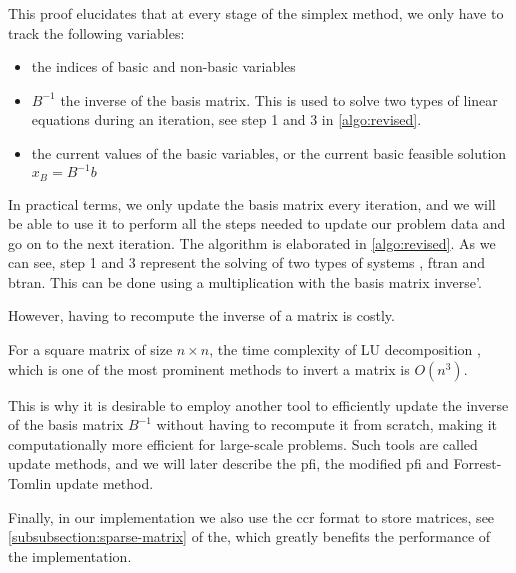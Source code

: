 This proof elucidates that at every stage of the simplex method, we only have to
 track the following variables:
\begin{itemize}
    \item the indices of basic and non-basic variables
    \item $B^{-1}$ the inverse of the basis matrix. This is used to solve two types of linear equations
    during an iteration, see step 1 and 3 in \ref{algo:revised}.
    \item the current values of the basic variables, or the current basic feasible solution $x_B = B^{-1}b$
\end{itemize}
In practical terms, we only update the basis matrix every iteration, and we will be able to use it to
perform all the steps needed to update our problem data and go on to the next
iteration.
The algorithm is elaborated in \ref{algo:revised}. As we can see, step 1 and 3 represent the solving of
two types of systems , \gls{ftran} and \gls{btran}. This can be done using a multiplication with
the basis matrix inverse'. 

However, having to recompute the inverse of a matrix is costly.

For a square matrix of size \(n \times n\), the time complexity of LU decomposition 
\parencite{golub2013matrix}, 
which is one of the 
most prominent methods to invert a matrix is $O(n^3) $.

This is why it is desirable to employ another tool to efficiently
update the inverse of the basis matrix $B^{-1}$
without having to recompute it from scratch,
making it computationally more efficient for large-scale problems. Such tools are called update methods,
and we will later describe the \gls{pfi}, the modified \gls{pfi} and Forrest-Tomlin update method. 

Finally, in our implementation we also use the \gls{ccr} format to store matrices, 
see \ref{subsubsection:sparse-matrix} of the,
which greatly benefits the performance of the implementation.

